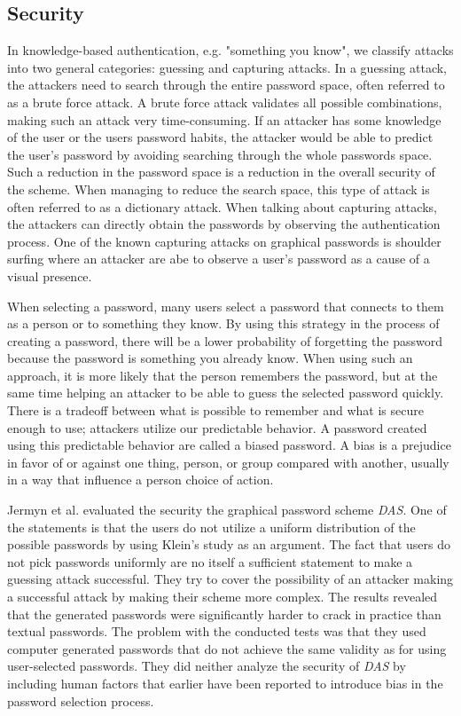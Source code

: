 	\subsection{Security} \label{sec:security}

    In knowledge-based authentication, e.g. "something you know", we classify attacks into two general categories: guessing and capturing attacks. In a guessing attack, the attackers need to search through the entire password space, often referred to as a brute force attack. A brute force attack validates all possible combinations, making such an attack very time-consuming. If an attacker has some knowledge of the user or the users password habits, the attacker would be able to predict the user's password by avoiding searching through the whole passwords space. Such a reduction in the password space is a reduction in the overall security of the scheme. When managing to reduce the search space, this type of attack is often referred to as a dictionary attack. When talking about capturing attacks, the attackers can directly obtain the passwords by observing the authentication process. One of the known capturing attacks on graphical passwords is shoulder surfing where an attacker are abe to observe a user's password as a cause of a visual presence.

    When selecting a password, many users select a password that connects to them as a person or to something they know. By using this strategy in the process of creating a password, there will be a lower probability of forgetting the password because the password is something you already know. When using such an approach, it is more likely that the person remembers the password, but at the same time helping an attacker to be able to guess the selected password quickly. There is a tradeoff between what is possible to remember and what is secure enough to use; attackers utilize our predictable behavior. A password created using this predictable behavior are called a biased password. A bias is a prejudice in favor of or against one thing, person, or group compared with another, usually in a way that influence a person choice of action. 

    Jermyn et al. \cite{Jermyn} evaluated the security the graphical password scheme {\it DAS}. One of the statements is that the users do not utilize a uniform distribution of the possible passwords by using Klein's study \cite{UnixPasswords} as an argument. The fact that users do not pick passwords uniformly are no itself a sufficient statement to make a guessing attack successful. They try to cover the possibility of an attacker making a successful attack by making their scheme more complex. The results revealed that the generated passwords were significantly harder to crack in practice than textual passwords. The problem with the conducted tests was that they used computer generated passwords that do not achieve the same validity as for using user-selected passwords. They did neither analyze the security of {\it DAS} by including human factors that earlier have been reported to introduce bias in the password selection process.

